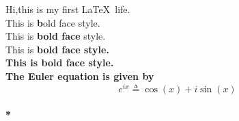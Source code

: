 \documentclass[11pt,a4paper]{article}   %
\begin{document}
    Hi,this is my first \LaTeX\ life.\\
    \linebreak[4]   %
    This is \textbf bold face style.\\  %
    This is \textbf{bold face} style.\\ %
    This is \bfseries bold face style.\\    %
    This is {\bfseries bold face} style.\\    %
    \newpage	%
    \pagebreak[2]   %
    The Euler equation is given by\\[3mm]	%
    $$e^{ix} \triangleq \cos(x) + i\sin(x)$$
    \\*     %
\end{document}
